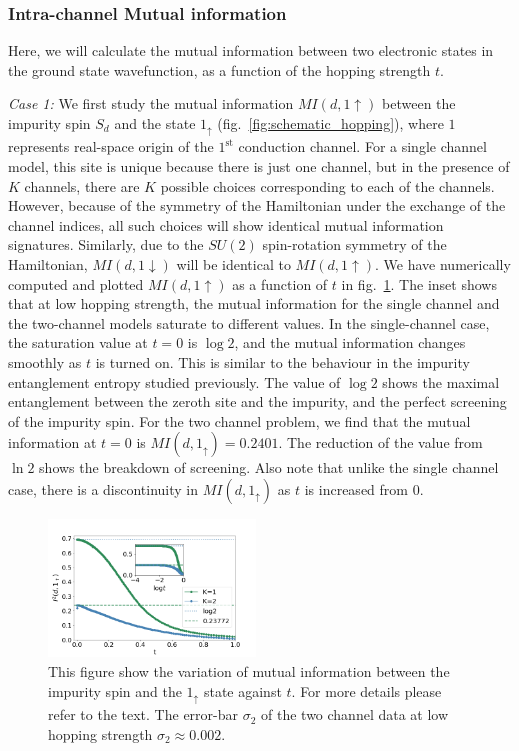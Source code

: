 \documentclass[reprint,prb,superscriptaddress]{revtex4-2}
\begin{document}
\subsubsection{Intra-channel Mutual information}
Here, we will calculate the mutual information between two electronic states in the ground state wavefunction, as a function of the hopping strength $t$. 

\par \textit{Case 1:} We first study the mutual information $MI(d,1\uparrow)$ between the impurity spin $S_d$ and the state $1_\uparrow$ (fig.~\ref{fig:schematic_hopping}), where $1$ represents real-space origin of the $1^\text{st}$ conduction channel. For a single channel model, this site is unique because there is just one channel, but in the presence of $K$ channels, there are $K$ possible choices corresponding to each of the channels. However, because of the symmetry of the Hamiltonian under the exchange of the channel indices, all such choices will show identical mutual information signatures. Similarly, due to the $SU(2)$ spin-rotation symmetry of the Hamiltonian, $MI(d,1\downarrow)$ will be identical to $MI(d,1\uparrow)$. We have numerically computed and plotted $MI(d,1\uparrow)$ as a function of $t$ in fig.~\ref{fig:MI_imp_1_vs_t_K}.  The inset shows that at low hopping strength, the mutual information for the single channel and the two-channel models saturate to different values. In the single-channel case, the saturation value at $t=0$ is $\log 2$, and the mutual information changes smoothly as \(t\) is turned on. This is similar to the behaviour in the impurity entanglement entropy studied previously. The value of $\log 2$ shows the maximal entanglement between the zeroth site and the impurity, and the perfect screening of the impurity spin. For the two channel problem, we find that the mutual information at \(t=0\) is $MI(d,1_{\uparrow})=0.2401$. The reduction of the value from \(\ln 2\) shows the breakdown of screening. Also note that unlike the single channel case, there is a discontinuity in $MI(d,1_{\uparrow})$ as \(t\) is increased from 0.

\begin{figure}[!htpb]
\includegraphics[width=0.49\textwidth]{AI2ch12d1up}
\caption{This figure show the variation of mutual information between the impurity spin and the $1_{\uparrow}$ state against $t$. For more details please refer to the text. The error-bar $\sigma_2$ of the two channel data at low hopping strength $\sigma_2\approx 0.002$.}
\label{fig:MI_imp_1_vs_t_K}
\end{figure}
\end{document}
